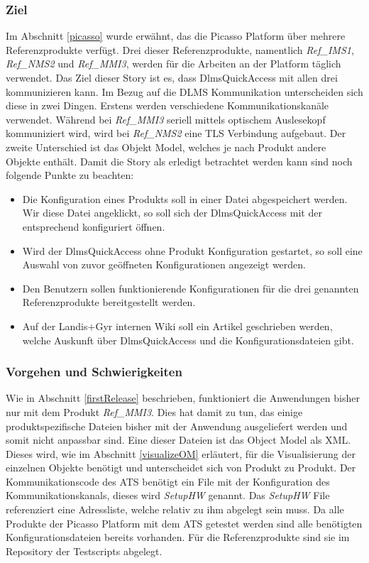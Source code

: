 \subsubsection{Ziel}
Im Abschnitt \ref{picasso} wurde erwähnt, das die Picasso Platform über mehrere Referenzprodukte verfügt.
Drei dieser Referenzprodukte, namentlich \textit{Ref\_IMS1}, \textit{Ref\_NMS2} und \textit{Ref\_MMI3}, werden für die Arbeiten an der Platform täglich verwendet.
Das Ziel dieser Story ist es, dass DlmsQuickAccess mit allen drei kommunizieren kann.
Im Bezug auf die \ac{DLMS} Kommunikation unterscheiden sich diese in zwei Dingen.
Erstens werden verschiedene Kommunikationskanäle verwendet. 
Während bei \textit{Ref\_MMI3} seriell mittels optischem Auslesekopf kommuniziert wird, wird bei \textit{Ref\_NMS2} eine \ac{TLS} Verbindung aufgebaut.
Der zweite Unterschied ist das Objekt Model, welches je nach Produkt andere Objekte enthält.
Damit die Story als erledigt betrachtet werden kann sind noch folgende Punkte zu beachten:
\begin{itemize}
   \item Die Konfiguration eines Produkts soll in einer Datei abgespeichert werden. Wir diese Datei angeklickt, so soll sich der DlmsQuickAccess mit der entsprechend konfiguriert öffnen. %
   \item Wird der DlmsQuickAccess ohne Produkt Konfiguration gestartet, so soll eine Auswahl von zuvor geöffneten Konfigurationen angezeigt werden.
   \item Den Benutzern sollen funktionierende Konfigurationen für die drei genannten Referenzprodukte bereitgestellt werden.
   \item Auf der Landis+Gyr internen Wiki soll ein Artikel geschrieben werden, welche Auskunft über DlmsQuickAccess und die Konfigurationsdateien gibt.
\end{itemize}

\subsubsection{Vorgehen und Schwierigkeiten}
Wie in Abschnitt \ref{firstRelease} beschrieben, funktioniert die Anwendungen bisher nur mit dem Produkt \textit{Ref\_MMI3}.
Dies hat damit zu tun, das einige produktspezifische Dateien bisher mit der Anwendung ausgeliefert werden und somit nicht anpassbar sind.
Eine dieser Dateien ist das Object Model als XML. 
Dieses wird, wie im Abschnitt \ref{visualizeOM} erläutert, für die Visualisierung der einzelnen Objekte benötigt und unterscheidet sich von Produkt zu Produkt.
Der Kommunikationscode des \ac{ATS} benötigt ein File mit der Konfiguration des Kommunikationskanals, dieses wird \textit{SetupHW} genannt.
Das \textit{SetupHW} File referenziert eine Adressliste, welche relativ zu ihm abgelegt sein muss.
Da alle Produkte der Picasso Platform mit dem \ac{ATS} getestet werden sind alle benötigten Konfigurationsdateien bereits vorhanden.
Für die Referenzprodukte sind sie im Repository der Testscripts abgelegt.

